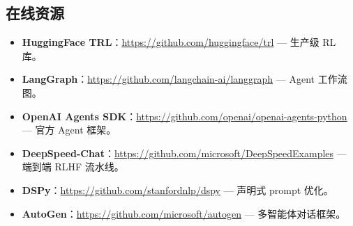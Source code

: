 \subsection{在线资源}
\label{online-resources}

\begin{itemize}
  \item \textbf{HuggingFace TRL}：\href{https://github.com/huggingface/trl}{https://github.com/huggingface/trl} --- 生产级 RL 库。
  \item \textbf{LangGraph}：\href{https://github.com/langchain-ai/langgraph}{https://github.com/langchain-ai/langgraph} --- Agent 工作流图。
  \item \textbf{OpenAI Agents SDK}：\href{https://github.com/openai/openai-agents-python}{https://github.com/openai/openai-agents-python} --- 官方 Agent 框架。
  \item \textbf{DeepSpeed-Chat}：\href{https://github.com/microsoft/DeepSpeedExamples}{https://github.com/microsoft/DeepSpeedExamples} --- 端到端 RLHF 流水线。
  \item \textbf{DSPy}：\href{https://github.com/stanfordnlp/dspy}{https://github.com/stanfordnlp/dspy} --- 声明式 prompt 优化。
  \item \textbf{AutoGen}：\href{https://github.com/microsoft/autogen}{https://github.com/microsoft/autogen} --- 多智能体对话框架。

\end{itemize}
